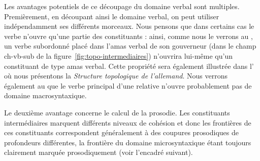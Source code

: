 Les avantages potentiels de ce découpage du domaine verbal sont multiples. Premièrement, en découpant ainsi le domaine verbal, on peut utiliser indépendamment ses différents morceaux. Nous pensons que dans certains cas le verbe n’ouvre qu’une partie des constituants : ainsi, comme nous le verrons au , un verbe subordonné placé dans l’amas verbal de son gouverneur (dans le champ ch-vb-sub de la figure~\ref{fig:topo-intermediaires}) n’ouvrira lui-même qu’un constituant de type amas verbal. Cette propriété sera également illustrée dans l’ où nous présentons la \textit{Structure topologique de l’allemand}. Nous verrons également au  que le verbe principal d’une relative n’ouvre probablement pas de domaine macrosyntaxique.

Le deuxième avantage concerne le calcul de la prosodie. Les constituants intermédiaires marquent différents niveaux de cohésion et donc les frontières de ces constituants correspondent généralement à des coupures prosodiques de profondeurs différentes, la frontière du domaine microsyntaxique étant toujours clairement marquée prosodiquement (voir l'encadré suivant).\largerpage[1.75]

